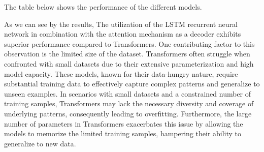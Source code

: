 \documentclass{adonis}
\begin{document}
The table below shows the performance of the different models.

    \begin{table}[h]
        \centering
        \caption{Results of our proposed models on the created dataset. The numbers in the decoder names mean the number of layers}
        \label{table2}
    \end{table}


As we can see by the results, The utilization of the LSTM recurrent neural network in combination with the attention mechanism as a decoder exhibits superior performance compared to Transformers. One contributing factor to this observation is the limited size of the dataset. Transformers often struggle when confronted with small datasets due to their extensive parameterization and high model capacity. These models, known for their data-hungry nature, require substantial training data to effectively capture complex patterns and generalize to unseen examples. In scenarios with small datasets and a constrained number of training samples, Transformers may lack the necessary diversity and coverage of underlying patterns, consequently leading to overfitting. Furthermore, the large number of parameters in Transformers exacerbates this issue by allowing the models to memorize the limited training samples, hampering their ability to generalize to new data.
\end{document}
